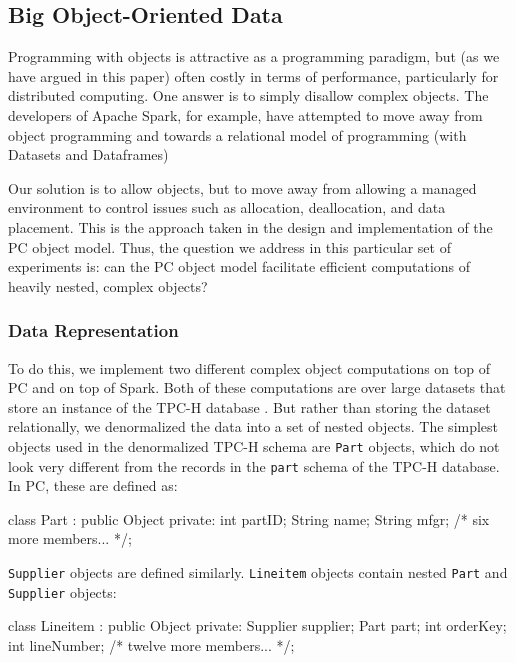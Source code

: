 \subsection{Big Object-Oriented Data}

Programming with objects is attractive as a programming paradigm, but (as we have argued in this paper)
often costly in terms of performance, particularly
for distributed computing.  One answer is to simply disallow complex objects.  The 
developers of Apache Spark, for example, have attempted to move away from object programming
and towards a relational model of programming (with Datasets and Dataframes) 

Our solution is to allow objects, but to move away from allowing a managed environment to control 
issues such as allocation, deallocation, and data placement.  This is the approach taken in the design and implementation
of the PC object model.  Thus, the question we address in this particular set of experiments is: can the PC 
object model facilitate efficient computations of heavily nested, complex objects?

\subsubsection{Data Representation}

To do this, we implement two different complex object computations on top of PC and on top of Spark.
Both of these computations are over large datasets that store an instance of the TPC-H database \cite{council2008tpc}.
But rather than storing the dataset relationally, we denormalized the data into a set of nested objects. 
The simplest objects used in the denormalized TPC-H schema are 
\texttt{Part} objects, which do not look very different from the records in the  \texttt{part} schema of the TPC-H database.
In PC, these are defined as:

\begin{codesmall}
class Part : public Object {
private:
   int partID;
   String name;
   String mfgr;
   /* six more members... */};
\end{codesmall}

\noindent
\texttt{Supplier} objects are defined similarly.
\texttt{Lineitem} objects contain nested \texttt{Part} and \texttt{Supplier} objects:

\begin{codesmall}
class Lineitem : public Object {
private:
   Supplier supplier;
   Part part;
   int orderKey;
   int lineNumber;
   /* twelve more members... */}; 
\end{codesmall}
 

